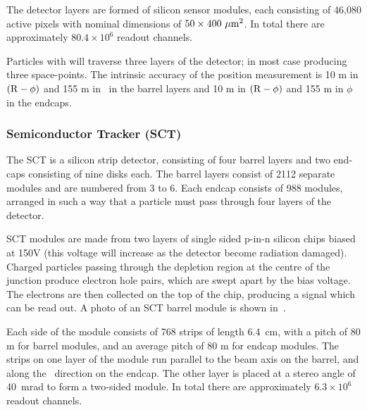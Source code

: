 The detector layers are formed of silicon sensor modules, 
each consisting of 46,080 active pixels with nominal dimensions of
$50\times400~\mu \rm{m}^{2}$. In total
there are approximately $80.4\times 10^{6}$ readout channels.

Particles with  will traverse three layers of the detector; in most case
producing three space-points. The intrinsic accuracy of the position
measurement is 10 \micro m in $(\rm{R}-\phi)$ and 155 \micro m in \z\ in the
barrel layers and 10 \micro m in $(\rm{R}-\phi)$ and 155 \micro m in $\phi$ in
the endcaps.

\subsubsection{Semiconductor Tracker (SCT)}

\label{sec:Detector-SCT}

The SCT is a silicon strip detector, consisting of four barrel layers and two end-caps
consisting of nine disks each. The barrel layers consist of 2112 separate modules and
are numbered from 3 to 6. Each
endcap consists of 988 modules, arranged in such a way that a particle must pass
through four layers of the detector.

SCT modules are made from two layers of single sided p-in-n silicon chips biased
at 150V (this voltage will increase as the detector become radiation damaged). 
Charged particles passing through the depletion region at the centre of
the junction produce electron hole pairs, which are swept apart by the bias
voltage. The electrons are then collected on the top of the chip, producing a
signal which can be read out. A photo of an SCT barrel module is shown
in~.

Each side of the module consists of 768 strips of length 6.4~cm,
with a pitch of 80 \micro m for barrel modules, and an average pitch of 80
\micro m for endcap modules. The strips on one layer
of the module run parallel to the
beam axis on the barrel, and along the \R\ direction on the endcap. The other
layer is placed at a stereo angle of 40~mrad to form a two-sided module. 
In total
there are approximately $6.3 \times 10^{6}$ readout channels.


